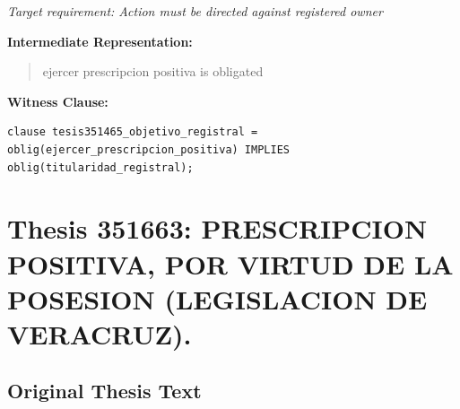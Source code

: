 \documentclass[11pt,a4paper]{article}
\begin{document}
\textit{Target requirement: Action must be directed against registered owner}

\textbf{Intermediate Representation:}

\begin{quote}
ejercer prescripcion positiva is obligated
\end{quote}

\textbf{Witness Clause:}

\begin{lstlisting}[style=witnessstyle, language=Witness]
clause tesis351465_objetivo_registral = oblig(ejercer_prescripcion_positiva) IMPLIES oblig(titularidad_registral);
\end{lstlisting}

\newpage

\section{Thesis 351663: PRESCRIPCION POSITIVA, POR VIRTUD DE LA POSESION (LEGISLACION DE VERACRUZ).}
\label{thesis:351663}

\subsection{Original Thesis Text}
\end{document}
